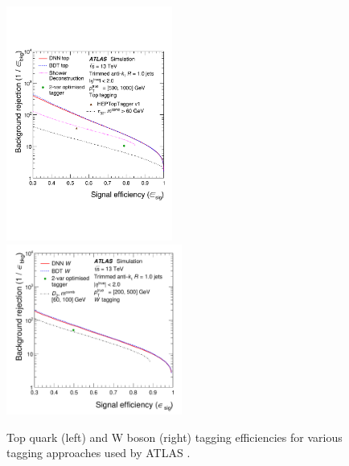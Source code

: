 \begin{figure}[t]
 \includegraphics[width=0.485\textwidth]{figures/roc_topATLAS.pdf}
  \includegraphics[width=0.515\textwidth]{figures/roc_WATLAS.pdf}
  \caption{Top quark (left) and W boson (right) tagging efficiencies for various tagging approaches used by ATLAS \cite{Aaboud:2018psm}.}\label{fig:roc_tag_atlas}
\end{figure}

